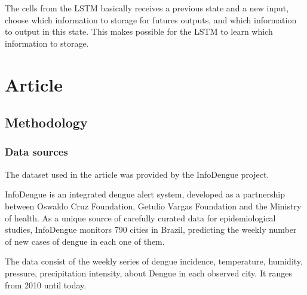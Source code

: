 \documentclass[12pt]{report}
\begin{document}
The cells from the LSTM basically receives a previous state and a new input, choose which information to storage for futures outputs, and which information to output in this state.
This makes possible for the LSTM to learn which information to storage.

\newpage	
\chapter{Article}

\section{Methodology}


\subsection{Data sources}
The dataset used in the article was provided by the InfoDengue project. 

InfoDengue \citet{codeco2016infodengue} is an integrated dengue alert system, developed as a partnership between Oswaldo Cruz Foundation, Getulio Vargas Foundation and the Ministry of health. As a unique source of carefully curated data for epidemiological studies, InfoDengue monitors 790 cities in Brazil, predicting the weekly number of new cases of dengue in each one of them.

The data consist of the weekly series of dengue incidence,  temperature, humidity, pressure, precipitation intensity, about Dengue in each observed city. It ranges from 2010 until today.
\end{document}

